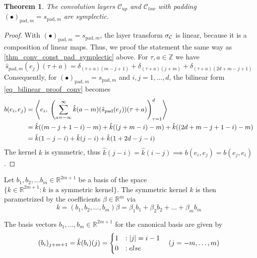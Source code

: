 \documentclass[twoside,a4paper]{article}
\newtheorem{theorem}{Theorem}
\begin{document}
\begin{theorem}
	The convolution layers $\mathcal{C}_{up}$ and $\mathcal{C}_{low}$
	with padding $(\bullet)_{\text{pad},m} = s_{\text{pad},m}$ are symplectic.
\end{theorem}
\begin{proof}
	With $(\bullet)_{\text{pad},m} = s_{\text{pad},m}$, the layer transform 
	$\sigma_{\mathcal{C}}$ is linear, because it is a composition of linear maps. Thus,
	we proof the statement the same way as \cref{thm_conv_const_pad_symplectic} above.
	For $\tau,a \in \mathbb{Z}$ we have
	\begin{equation*}
		\hat{s}_{\text{pad},m}(e_j)(\tau + a) = 
		\delta_{(\tau + a) (m-j+1)} + \delta_{(\tau + a) (j+m)} + \delta_{(\tau + a) (2d+m-j+1)}
	\end{equation*}
	Consequently, for $(\bullet)_{\text{pad},m} = s_{\text{pad},m}$ and $i,j=1, \dots, d$, 
	the bilinear form \cref{eq_bilinear_proof_conv} becomes
	\begin{align*}
		b(e_i, e_j) &= \left\langle e_i,\; 
			\left( \sum_{a=-\infty}^{\infty} 
				\hat{k}(a-m)
				(\hat{s}_{\text{pad}}(e_j))(\tau+a)
			\right)_{\tau=1}^d
		 \right\rangle \\
		&= \hat{k}((m-j+1-i)-m) + \hat{k}((j+m-i)-m) + \hat{k}((2d+m-j+1-i)-m) \\
		&= \hat{k}(1-j-i) + \hat{k}(j-i) + \hat{k}(1+2d-j-i)
	\end{align*}
	The kernel $k$ is symmetric, thus $\hat{k}(j-i) = \hat{k}(i-j) \implies b(e_i, e_j) = b(e_j,e_i)$.
\end{proof}

Let ${b_1, b_2, \dots b_m} \in \mathbb{R}^{2m+1}$ be a basis of the space 
$\{ k \in \mathbb{R}^{2m+1} : k \text{ is a symmetric kernel} \}$.
The symmetric kernel $k$ is then parametrized by the coefficients $\beta \in \mathbb{R}^m$ via
\begin{equation*}
	k = (b_1, b_2, \dots, b_m) \beta = \beta_1 b_1 + \beta_2 b_2 + \dots + \beta_m b_m
\end{equation*}

The basis vectors $b_1, \dots, b_m \in \mathbb{R}^{2m+1}$ for the canonical basis are given by
\begin{equation*}
	(b_i)_{j+m+1} = \hat{k}(b_i)(j) = \begin{cases}
		1 &: \left|{j}\right| = i-1 \\
		0 &:else
	\end{cases} 
	\quad (j=-m, \dots, m)
\end{equation*}
\end{document}
